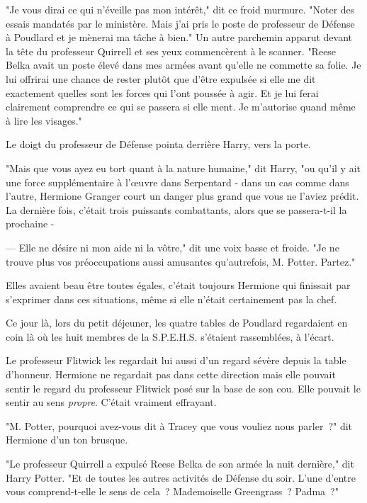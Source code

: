 "Je vous dirai ce qui n'éveille pas mon intérêt," dit ce froid murmure. "Noter des essais mandatés par le ministère. Mais j'ai pris le poste de professeur de Défense à Poudlard et je mènerai ma tâche à bien." Un autre parchemin apparut devant la tête du professeur Quirrell et ses yeux commencèrent à le scanner. "Reese Belka avait un poste élevé dans mes armées avant qu'elle ne commette sa folie. Je lui offrirai une chance de rester plutôt que d'être expulsée si elle me dit exactement quelles sont les forces qui l'ont poussée à agir. Et je lui ferai clairement comprendre ce qui se passera si elle ment. Je m'autorise quand même à lire les visages."

Le doigt du professeur de Défense pointa derrière Harry, vers la porte.

"Mais que vous ayez eu tort quant à la nature humaine," dit Harry, "ou qu'il y ait une force supplémentaire à l'œuvre dans Serpentard - dans un cas comme dans l'autre, Hermione Granger court un danger plus grand que vous ne l'aviez prédit. La dernière fois, c'était trois puissants combattants, alors que se passera-t-il la prochaine -

--- Elle ne désire ni mon aide ni la vôtre," dit une voix basse et froide. "Je ne trouve plus vos préoccupations aussi amusantes qu'autrefois, M. Potter. Partez."

\later

Elles avaient beau être toutes égales, c'était toujours Hermione qui finissait par s'exprimer dans ces situations, même si elle n'était certainement pas la chef.

Ce jour là, lors du petit déjeuner, les quatre tables de Poudlard regardaient en coin là où les huit membres de la S.P.E.H.S. s'étaient rassemblées, à l'écart.

Le professeur Flitwick les regardait lui aussi d'un regard sévère depuis la table d'honneur. Hermione ne regardait pas dans cette direction mais elle pouvait sentir le regard du professeur Flitwick posé sur la base de son cou. Elle pouvait le sentir au sens \emph{propre}. C'était vraiment effrayant.

"M. Potter, pourquoi avez-vous dit à Tracey que vous vouliez nous parler~?" dit Hermione d'un ton brusque.

"Le professeur Quirrell a expulsé Reese Belka de son armée la nuit dernière," dit Harry Potter. "Et de toutes les autres activités de Défense du soir. L'une d'entre vous comprend-t-elle le sens de cela~? Mademoiselle Greengrass~? Padma~?"

